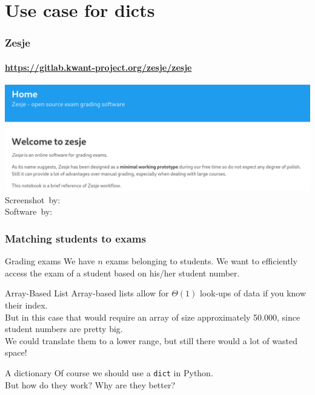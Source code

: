 \section{Use case for dicts}%
\label{sec:use_case_for_dicts}

\begin{frame}
	\frametitle{Zesje}
	\framesubtitle{\url{https://gitlab.kwant-project.org/zesje/zesje}}
\begin{center}
	\includegraphics[width=\textwidth]{figures/zesje.png}\\
	\hspace*{15pt}\hbox{\scriptsize Screenshot by: }\\
	\hspace*{15pt}\hbox{\scriptsize Software by: }
\end{center}	
\end{frame}

\begin{frame}
	\frametitle{Matching students to exams}

	\begin{problemblock}{Grading exams}
		We have $n$ exams belonging to students. We want to efficiently access the exam of a student based on his/her
		student number.
	\end{problemblock}

	\pause
		\begin{alertblock}{Array-Based List}
			Array-based lists allow for $\Theta(1)$ look-ups of data if you know their index.\\
			\pause
			But in this case that would require an array of size approximately 50.000, since student numbers are pretty big.\\
			We could translate them to a lower range, but still there would a lot of wasted space!
		\end{alertblock}	
	
		\pause
			\begin{exampleblock}{A dictionary}
				Of course we should use a \texttt{dict} in Python. \\
				\pause
				But how do they work? Why are they better?
			\end{exampleblock}	
\end{frame}

